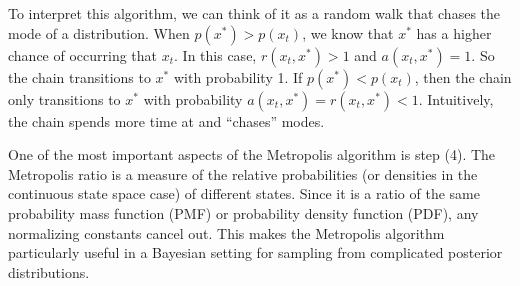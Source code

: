 \documentclass[11pt]{amsart}
\theoremstyle{theorem} %
\theoremstyle{definition}                  %
\theoremstyle{example}                       %
\theoremstyle{remark}                       %
\numberwithin{equation}{section}
\begin{document}
To interpret this algorithm, we can think of it as a random walk that chases the mode of a distribution. When $p(x^*)>p(x_t)$, we know that $x^*$ has a higher chance of occurring that $x_t$. In this case, $r(x_t,x^*)>1$ and $a(x_t,x^*)=1$. So the chain transitions to $x^*$ with probability 1. If $p(x^*)<p(x_t)$, then the chain only transitions to $x^*$ with probability $a(x_t, x^*)=r(x_t, x^*)<1$. Intuitively, the chain spends more time at and ``chases'' modes.

One of the most important aspects of the Metropolis algorithm is step (4). The Metropolis ratio is a measure of the relative probabilities (or densities in the continuous state space case) of different states. Since it is a ratio of the same probability mass function (PMF) or probability density function (PDF), any normalizing constants cancel out. This makes the Metropolis algorithm particularly useful in a Bayesian setting for sampling from complicated posterior distributions. 
\end{document}
